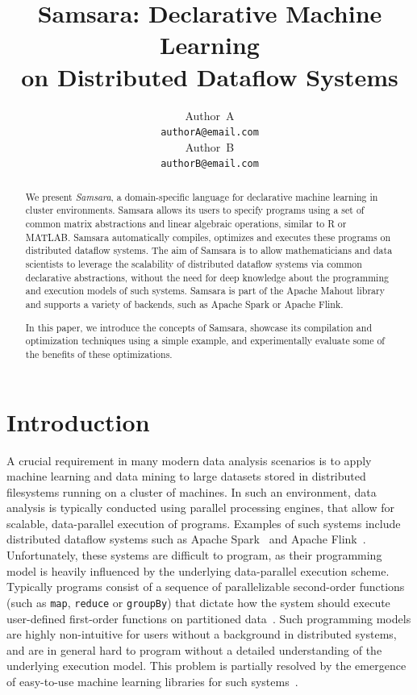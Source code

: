 \documentclass{article}
\title{Samsara: Declarative Machine Learning\\ on Distributed Dataflow Systems}
\author{
  Author~A\\
  \texttt{authorA@email.com} \\
  \And
  Author~B\\
  \texttt{authorB@email.com} \\
}
\begin{document}

\maketitle

\begin{abstract}
  We present {\em Samsara}, a domain-specific language for declarative machine learning in cluster environments. Samsara allows its users to specify programs using a set of common matrix abstractions and linear algebraic operations, similar to R or MATLAB. Samsara automatically compiles, optimizes and executes these programs on distributed dataflow systems. The aim of Samsara is to allow mathematicians and data scientists to leverage the scalability of distributed dataflow systems via common declarative abstractions, without the need for deep knowledge about the programming and execution models of such systems. Samsara is part of the Apache Mahout library and supports a variety of backends, such as Apache Spark or Apache Flink. 

  In this paper, we introduce the concepts of Samsara, showcase its compilation and optimization techniques using a simple example, and experimentally evaluate some of the benefits of these optimizations.
\end{abstract}

\section{Introduction}

A crucial requirement in many modern data analysis scenarios is to apply machine learning and data mining to large datasets stored in distributed filesystems running on a cluster of machines. In such an environment, data analysis is typically conducted using parallel processing engines, that allow for scalable, data-parallel execution of programs. Examples of such systems include distributed dataflow systems such as Apache Spark~\cite{Zaharia2012} and Apache Flink~\cite{Alexandrov2014}. Unfortunately, these systems are difficult to program, as their programming model is heavily influenced by the underlying data-parallel execution scheme. Typically programs consist of a sequence of parallelizable second-order functions (such as \texttt{map}, \texttt{reduce} or \texttt{groupBy}) that dictate how the system should execute user-defined first-order functions on partitioned data~\cite{Battre2010,Zaharia2012}. Such programming models are  highly non-intuitive for users without a background in distributed systems, and are in general hard to program without a detailed understanding of the underlying execution model. This problem is partially resolved by the emergence of easy-to-use machine learning libraries for such systems~\cite{Meng2016}.
\end{document}
